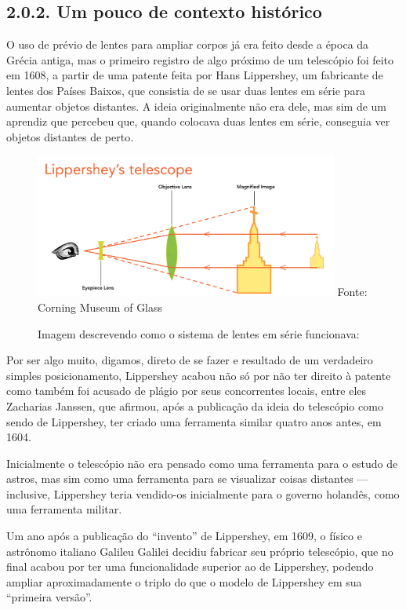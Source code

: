 \documentclass[
  a4paper]{article}
\begin{document}
\hypertarget{um-pouco-de-contexto-histuxf3rico}{%
\subsection{2.0.2. Um pouco de contexto
histórico}\label{um-pouco-de-contexto-histuxf3rico}}

O uso de prévio de lentes para ampliar corpos já era feito desde a época
da Grécia antiga, mas o primeiro registro de algo próximo de um
telescópio foi feito em 1608, a partir de uma patente feita por Hans
Lippershey, um fabricante de lentes dos Países Baixos, que consistia de
se usar duas lentes em série para aumentar objetos distantes. A ideia
originalmente não era dele, mas sim de um aprendiz que percebeu que,
quando colocava duas lentes em série, conseguia ver objetos distantes de
perto.

\begin{figure}[!h]
\centering
    \caption{Imagem descrevendo como o sistema de lentes em série funcionava:} 
    \includegraphics[width=100mm]{../_img/Untitled-1_1.jpg}
    \linebreak
    Fonte: Corning Museum of Glass 
\end{figure}

Por ser algo muito, digamos, direto de se fazer e resultado de um
verdadeiro simples posicionamento, Lippershey acabou não só por não ter
direito à patente como também foi acusado de plágio por seus
concorrentes locais, entre eles Zacharias Janssen, que afirmou, após a
publicação da ideia do telescópio como sendo de Lippershey, ter criado
uma ferramenta similar quatro anos antes, em 1604.

Inicialmente o telescópio não era pensado como uma ferramenta para o
estudo de astros, mas sim como uma ferramenta para se visualizar coisas
distantes --- inclusive, Lippershey teria vendido-os inicialmente para o
governo holandês, como uma ferramenta militar.

Um ano após a publicação do ``invento'' de Lippershey, em 1609, o físico
e astrônomo italiano Galileu Galilei decidiu fabricar seu próprio
telescópio, que no final acabou por ter uma funcionalidade superior ao
de Lippershey, podendo ampliar aproximadamente o triplo do que o modelo
de Lippershey em sua ``primeira versão''.
\end{document}
